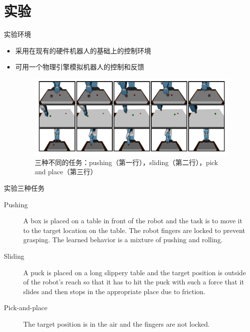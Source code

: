 \documentclass[10pt]{beamer}
\begin{document}
	\section{实验}
	
	\begin{frame}{实验}{环境}
		\begin{itemize}
			\item 采用在现有的硬件机器人的基础上的控制环境
			\item 可用一个物理引擎模拟机器人的控制和反馈
				\begin{figure}
					\centering
					\includegraphics[width=0.7\linewidth]{pictures/her-robot}
					\caption{三种不同的任务：pushing（第一行），sliding（第二行），pick and place（第三行）}
					\label{fig:her-robot}
				\end{figure}
				
		\end{itemize}
	\end{frame}

	\begin{frame}{实验}{三种任务}
		\begin{description}
			\item[Pushing] A box is placed on a table in front of the robot and the task is to move it to the target location on the table. The robot fingers are locked to prevent grasping. The learned behavior is a mixture of pushing and rolling.
			
			\item[Sliding] A puck is placed on a long slippery table and the target position is outside of the robot’s reach so that it has to hit the puck with such a force that it slides and then stops in the appropriate place due to friction.
			
			\item[Pick-and-place] The target position is in the air and the fingers are not locked. 
			
		\end{description}
	\end{frame}
\end{document}

